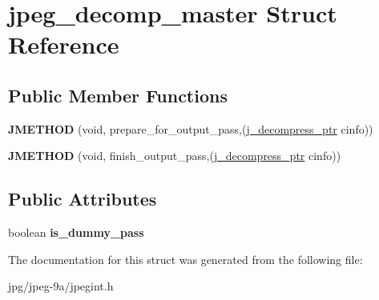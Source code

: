 \hypertarget{structjpeg__decomp__master}{\section{jpeg\+\_\+decomp\+\_\+master Struct Reference}
\label{structjpeg__decomp__master}
}
\subsection*{Public Member Functions}
\begin{DoxyCompactItemize}
\item 
\hypertarget{structjpeg__decomp__master_ab0e51667ba436fad82e7cf95b1bd4120}{{\bfseries J\+M\+E\+T\+H\+O\+D} (void, prepare\+\_\+for\+\_\+output\+\_\+pass,(\hyperlink{structjpeg__decompress__struct}{j\+\_\+decompress\+\_\+ptr} cinfo))}\label{structjpeg__decomp__master_ab0e51667ba436fad82e7cf95b1bd4120}

\item 
\hypertarget{structjpeg__decomp__master_a7dec615b828e443ddddf99078d1edb9a}{{\bfseries J\+M\+E\+T\+H\+O\+D} (void, finish\+\_\+output\+\_\+pass,(\hyperlink{structjpeg__decompress__struct}{j\+\_\+decompress\+\_\+ptr} cinfo))}\label{structjpeg__decomp__master_a7dec615b828e443ddddf99078d1edb9a}

\end{DoxyCompactItemize}
\subsection*{Public Attributes}
\begin{DoxyCompactItemize}
\item 
\hypertarget{structjpeg__decomp__master_a93cbde036bd87ab00b0ac8214e27bbe1}{boolean {\bfseries is\+\_\+dummy\+\_\+pass}}\label{structjpeg__decomp__master_a93cbde036bd87ab00b0ac8214e27bbe1}

\end{DoxyCompactItemize}


The documentation for this struct was generated from the following file\+:\begin{DoxyCompactItemize}
\item 
jpg/jpeg-\/9a/jpegint.\+h\end{DoxyCompactItemize}
